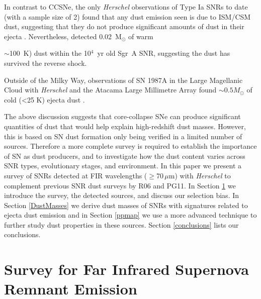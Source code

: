 \documentclass[fleqn,usenatbib]{mnras}
\begin{document}
In contrast to CCSNe, the only \textit{Herschel} observations of Type Ia SNRs to date (with a sample size of 2) found that any dust emission seen is due to ISM/CSM dust, suggesting that they do not produce significant amounts of dust in their ejecta \citep{Gomez2012a}. Nevertheless, \cite{Lau2015} detected 0.02~M$_\odot$ of warm {$\sim$100~K) dust within the 10$^4$~yr old Sgr~A SNR, suggesting the dust has survived the reverse shock.

Outside of the Milky Way, observations of SN 1987A in the Large Magellanic Cloud with \textit{Herschel} and the Atacama Large Millimetre Array found $\sim0.5 M_\odot$ of cold (<25 K) ejecta dust \citep{Matsuura2011, Matsuura2015, Indebetouw2014, Dwek2015}.


The above discussion suggests that core-collapse SNe can produce significant quantities of dust that would help explain high-redshift dust masses. However, this is based on SN dust formation only being verified in a limited number of sources. %
Therefore a more complete survey is required to establish the importance of SN as dust producers, and to investigate how the dust content varies across SNR types, evolutionary stages, and environment. In this paper we present a survey of SNRs detected at FIR wavelengths ($\geq$70\,$\mu$m) with \textit{Herschel} to complement previous SNR dust surveys by R06 and PG11. In Section \ref{FIRSurvey} we introduce the survey, the detected sources, and discuss our selection bias. In Section \ref{DustMasses} we derive dust masses of SNRs with signatures related to ejecta dust emission and in Section \ref{ppmap} we use a more advanced technique to further study dust properties in these sources. Section \ref{conclusions} lists our conclusions.

\section{Survey for Far Infrared Supernova Remnant Emission} \label{FIRSurvey}

}
\end{document}
